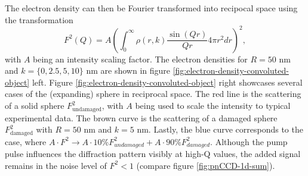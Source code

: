 The electron density can then be Fourier transformed into recipocal space using the transformation \citep{Guinier-1955-JWS}
\begin{equation}
F^{2}(Q)=A\left(\int_{0}^{\infty}\rho\left(r,k\right)\frac{\sin\left(Q r\right)}{Qr}4 \pi r^{2}dr\right)^{2},
\label{eq:guinier-fourier-transform}
\end{equation}
with $A$ being an intensity scaling factor. The electron densities for $R=50$ nm and $k=\{0,2.5,5,10\}$ nm are shown in figure \ref{fig:electron-density-convoluted-object} left. Figure \ref{fig:electron-density-convoluted-object} right showcases several cases of the (expanding) sphere in reciprocal space. The red line is the scattering of a solid sphere $F_{\text{undamaged}}^{2}$, with $A$ being used to scale the intensity to typical experimental data. The brown curve is the scattering of a damaged sphere $F_{\text{damaged}}^{2}$ with $R=50$ nm and $k=5$ nm. Lastly, the blue curve corresponds to the case, where $A\cdot F^{2}\rightarrow A \cdot 10\% F_{undamaged}^{2}+A \cdot 90\% F_{damaged}^{2}$. Although the pump pulse influences the diffraction pattern visibly at high-Q values, the added signal remains in the noise level of $F^{2}<1$ (compare figure \ref{fig:pnCCD-1d-sum}).
%
%
%
